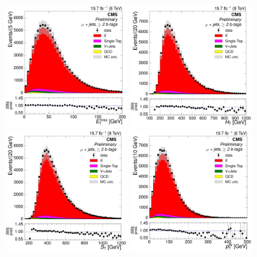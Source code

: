 \begin{figure}[hbtp]
    \centering
     \includegraphics[width=0.48\textwidth]{Chapters/04_Analysis/04b_XSections/images/control_plots/before_fit/8TeV/MuPlusJets_patType1CorrectedPFMet_2orMoreBtags_with_ratio.pdf}\hfill
     \includegraphics[width=0.48\textwidth]{Chapters/04_Analysis/04b_XSections/images/control_plots/before_fit/8TeV/MuPlusJets_HT_2orMoreBtags_with_ratio.pdf}\\
     \includegraphics[width=0.48\textwidth]{Chapters/04_Analysis/04b_XSections/images/control_plots/before_fit/8TeV/MuPlusJets_patType1CorrectedPFMet_ST_2orMoreBtags_with_ratio.pdf}\hfill
     \includegraphics[width=0.48\textwidth]{Chapters/04_Analysis/04b_XSections/images/control_plots/before_fit/8TeV/MuPlusJets_patType1CorrectedPFMet_WPT_2orMoreBtags_with_ratio.pdf}\\

\end{figure}
